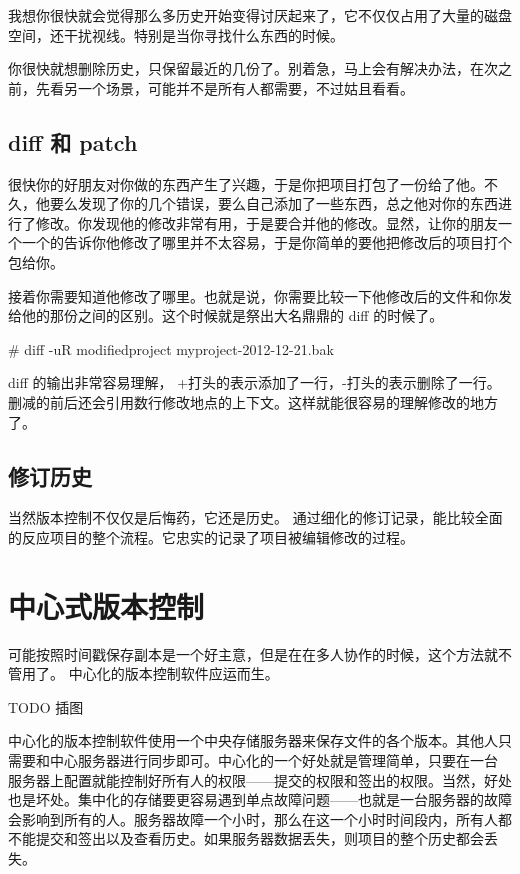 我想你很快就会觉得那么多历史开始变得讨厌起来了，它不仅仅占用了大量的磁盘空间，还干扰视线。特别是当你寻找什么东西的时候。

你很快就想删除历史，只保留最近的几份了。别着急，马上会有解决办法，在次之前，先看另一个场景，可能并不是所有人都需要，不过姑且看看。

\subsection{diff 和 patch}

很快你的好朋友对你做的东西产生了兴趣，于是你把项目打包了一份给了他。不久，他要么发现了你的几个错误，要么自己添加了一些东西，总之他对你的东西进行了修改。你发现他的修改非常有用，于是要合并他的修改。显然，让你的朋友一个一个的告诉你他修改了哪里并不太容易，于是你简单的要他把修改后的项目打个包给你。

接着你需要知道他修改了哪里。也就是说，你需要比较一下他修改后的文件和你发给他的那份之间的区别。这个时候就是祭出大名鼎鼎的 diff 的时候了。

\begin{code}
\# diff -uR modifiedproject  myproject-2012-12-21.bak
\end{code}

diff 的输出非常容易理解， +打头的表示添加了一行，-打头的表示删除了一行。删减的前后还会引用数行修改地点的上下文。这样就能很容易的理解修改的地方了。



\subsection{修订历史}

当然版本控制不仅仅是后悔药，它还是历史。
通过细化的修订记录，能比较全面的反应项目的整个流程。它忠实的记录了项目被编辑修改的过程。


\section{中心式版本控制}

可能按照时间戳保存副本是一个好主意，但是在在多人协作的时候，这个方法就不管用了。
中心化的版本控制软件应运而生。

TODO 插图

中心化的版本控制软件使用一个中央存储服务器来保存文件的各个版本。其他人只需要和中心服务器进行同步即可。中心化的一个好处就是管理简单，只要在一台 服务器上配置就能控制好所有人的权限——提交的权限和签出的权限。当然，好处也是坏处。集中化的存储要更容易遇到单点故障问题——也就是一台服务器的故障会影响到所有的人。服务器故障一个小时，那么在这一个小时时间段内，所有人都不能提交和签出以及查看历史。如果服务器数据丢失，则项目的整个历史都会丢失。


